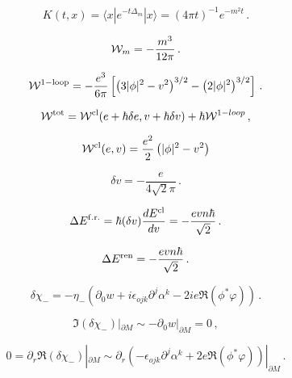 \documentclass[]{article}
\begin{document}
\begin{equation}
	K(t,x)=\langle x | e^{-t\Delta_m } | x\rangle = (4\pi t)^{-1}
	e^{-m^2t} \,.\label{Ktx}
\end{equation}

\begin{equation}
	{\cal W}_m =-\frac {m^3}{12\pi} \,.\label{cWm}
\end{equation}

\begin{equation}
	{\cal W}^{\rm 1-loop} = -\frac{e^3}{6\pi} \left[ \left( 3|\phi |^2
	-v^2 \right)^{3/2} -\left( 2|\phi |^2 \right)^{3/2} \right]
	\,.\label{W1loop}
\end{equation}

\begin{equation}
	{\cal W}^{\rm tot}={\cal W}^{\rm cl}(e+\hbar \delta e,v +\hbar\delta v)
	+\hbar {\cal W}^{1-loop} \,,\label{Wtot} 
\end{equation}


\begin{equation}
	{\cal W}^{\rm cl}(e,v)=\frac{e^2}2 \left( |\phi |^2 -v^2 \right) 
	\label{Wclass}
\end{equation}

\begin{equation}
	\delta v = -\frac{e}{4\sqrt{2}\pi}\,.\label{deltav}
\end{equation}

\begin{equation}
	\Delta E^{\rm f.r.}=\hbar (\delta v)\frac{dE^{\rm cl}}{dv}=
	-\frac{evn\hbar}{\sqrt{2}} \,.\label{DEfr}
\end{equation}

\begin{equation}
	\Delta E^{\rm ren}=-\frac{evn\hbar}{\sqrt{2}} \,.\label{finres}
\end{equation}

\begin{equation}
	\delta \chi_-=-\eta_- \left( \partial_0 w +i\epsilon_{ojk}
	\partial^j \alpha^k -2i e \Re ( \phi^* \varphi ) \right) \,.
	\label{delchim}
\end{equation}

\begin{equation}
	\Im (\delta \chi_-) |_{\partial M} \sim -\partial_0 w |_{\partial
		M}=0 \,,\label{apa1}
\end{equation}

\begin{equation}
	0=\partial_r \Re (\delta \chi_-)|_{\partial M} \sim
	\partial_r \left( -\epsilon_{ojk}
	\partial^j \alpha^k + 2e \Re ( \phi^* \varphi ) \right)|_{\partial M}
	\,.\label{apa2}
\end{equation}
\end{document}
